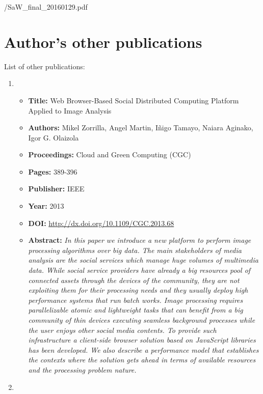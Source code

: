 \ifattachpapers
	 {\PublicationsPath/SaW_final_20160129.pdf}
\fi

\chapter{Author's other publications}

List of other publications:

\begin{enumerate}
\item 
\begin{itemize} \itemsep1pt\parskip0pt
	\item \textbf{Title:} Web Browser-Based Social Distributed Computing Platform Applied to Image Analysis
	\item \textbf{Authors:} Mikel Zorrilla, Angel Martin, Iñigo Tamayo, Naiara Aginako, Igor G. Olaizola
	\item \textbf{Proceedings:} Cloud and Green Computing (CGC)
	\item \textbf{Pages:} 389-396
 	\item \textbf{Publisher:} IEEE
	\item \textbf{Year:} 2013
	\item \textbf{DOI:} \url{http://dx.doi.org/10.1109/CGC.2013.68}
	\item \textbf{Abstract:} \textit{In this paper we introduce a new platform to perform image processing algorithms over big data. The main stakeholders of media analysis are the social services which manage huge volumes of multimedia data. While social service providers have already a big resources pool of connected assets through the devices of the community, they are not exploiting them for their processing needs and they usually deploy high performance systems that run batch works. Image processing requires parallelizable atomic and lightweight tasks that can benefit from a big community of thin devices executing seamless background processes while the user enjoys other social media contents. To provide such infrastructure a client-side browser solution based on JavaScript libraries has been developed. We also describe a performance model that establishes the contexts where the solution gets ahead in terms of available resources and the processing problem nature.}
\end{itemize}
\hrulefill
\item 
\begin{itemize} \itemsep1pt\parskip0pt

\end{itemize}
\end{enumerate}
